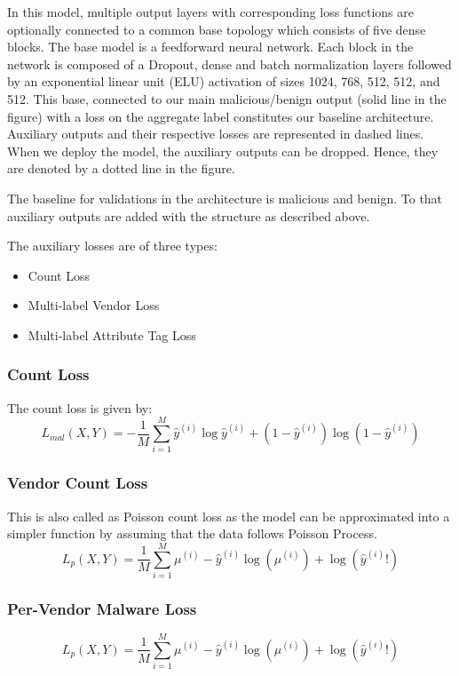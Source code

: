 \documentclass[conference]{IEEEtran}
\begin{document}
In this model, multiple output layers with corresponding loss functions are optionally connected to a common base topology which consists of five dense blocks. The base model is a feedforward neural network. Each block in the network is composed of a Dropout, dense and batch normalization layers followed by an exponential linear unit (ELU) activation of sizes 1024, 768, 512, 512, and 512. This base, connected to our main malicious/benign output (solid line in the figure) with a loss on the aggregate label constitutes our baseline architecture. Auxiliary outputs and their respective losses are represented in dashed lines. When we deploy the model, the auxiliary outputs can be dropped. Hence, they are denoted by a dotted line in the figure.

The baseline for validations in the architecture is malicious and benign. To that auxiliary outputs are added with the structure as described above.

The auxiliary losses are of three types:
\begin{itemize}
    \item Count Loss
    \item Multi-label Vendor Loss
    \item  Multi-label Attribute Tag Loss
\end{itemize}
\subsubsection{Count Loss}
The count loss is given by:
\begin{equation}
  \label{eq:count_loss}
  L_{mal}(X,Y) = -\frac{1}{M} \sum^{M}_{i=1} \hat{y}^{(i)}\log{\hat{y}^{(i)}}+(1-\hat{y}^{(i)})\log(1-\hat{y}^{(i)})
\end{equation}

\subsubsection{Vendor Count Loss}
This is also called as Poisson count loss as the model can be approximated into a simpler function by assuming that the data follows Poisson Process.\cite{b3}
\begin{equation}
  \label{eq:vendor_count_loss}
  L_{p}(X,Y) = \frac{1}{M} \sum^{M}_{i=1} \mu^{(i)}-\hat{y}^{(i)}\log{(\mu^{(i)})} + \log{(\hat{y}^{(i)}!)} 
\end{equation}
\subsubsection{ Per-Vendor Malware Loss}
\begin{equation}
  \label{eq:per_vendor_malware_loss}
  L_{p}(X,Y) = \frac{1}{M} \sum^{M}_{i=1} \mu^{(i)}-\hat{y}^{(i)}\log{(\mu^{(i)})} + \log{(\hat{y}^{(i)}!)} 
\end{equation}
\end{document}
